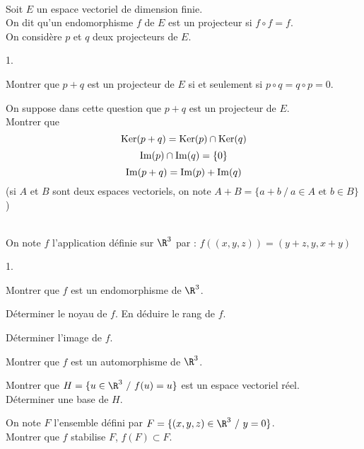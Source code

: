 \documentclass[11pt]{article}%
\begin{document}
\newpage

\begin{exercice}~\\
Soit $E$ un espace vectoriel de dimension finie.\\
On dit qu'un endomorphisme $f$ de $E$ est un projecteur si $f\circ 
f=f$.\\
On considère $p$ et $q$ deux projecteurs de $E$.
\begin{noliste}{1.}
\item Montrer que $p+q$ est un projecteur de $E$ si et seulement si 
$p\circ q = q \circ p=0$.
\item On suppose dans cette question que $p+q$ est un projecteur de 
$E$.\\
Montrer que
\[
  \operatorname{Ker}(p+q)=\operatorname{Ker}(p)\cap\operatorname{Ker}(q)
\]
\[
  \operatorname{Im}(p)\cap\operatorname{Im}(q)=\{0\}
\]
\[
  \operatorname{Im}(p+q)=\operatorname{Im}(p)+\operatorname{Im}(q)
\]
(si $A$ et $B$ sont deux espaces vectoriels, on note $A+B=\{a+b \ / \ 
a\in A \mbox{ et } b\in B\}$)
\end{noliste}
\end{exercice}


\begin{exercice}~\\
On note $f$ l'application définie sur $\R^3$ par : 
$f((x,y,z))=(y+z,y,x+y)$
\begin{noliste}{1.}
\item Montrer que $f$ est un endomorphisme de $\R^3$.
\item Déterminer le noyau de $f$. En déduire le rang de $f$.
\item Déterminer l'image de $f$.
\item Montrer que $f$ est un automorphisme de $\R^3$.
\item Montrer que $H=\{ u \in \R^3 \ / \ f(u)=u\}$ est un espace 
vectoriel réel.\\
Déterminer une base de $H$.
\item On note $F$ l'ensemble défini par $F=\{(x,y,z)\in\R^3 \ / \ 
y=0\}$.\\
Montrer que $f$ stabilise $F$, \ie $f(F)\subset F$.
\end{noliste}
\end{exercice}
\end{document}
